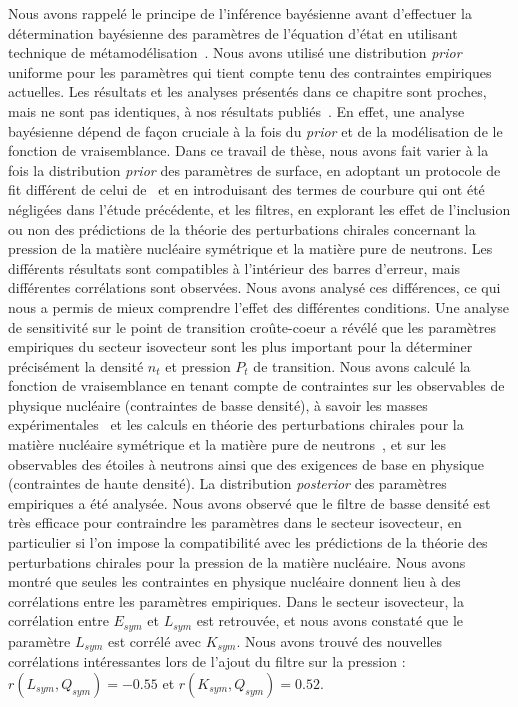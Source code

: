 Nous avons rappelé le principe de l'inférence bayésienne avant d'effectuer la  
détermination bayésienne des paramètres de l'équation d'état en utilisant 
technique de métamodélisation~\cite{Margueron2018a}. Nous avons utilisé une 
distribution \textit{prior} uniforme pour les paramètres qui tient compte tenu 
des contraintes empiriques actuelles. 
%
Les résultats et les analyses présentés dans ce chapitre sont proches, mais ne 
sont pas identiques, à nos résultats 
publiés~\cite{Carreau2019cc,Carreau2019moi}. 
En effet, une analyse bayésienne dépend de façon cruciale à la fois du
\textit{prior} et de la modélisation de le fonction de vraisemblance. 
Dans ce travail de thèse, nous avons fait varier à la fois la distribution
\textit{prior} des paramètres de surface, en adoptant un protocole de fit 
différent de celui de~\cite{Carreau2019cc,Carreau2019moi} et en introduisant 
des termes de courbure qui ont été négligées dans l'étude précédente, et les 
filtres, en explorant les effet de l'inclusion ou non des prédictions de la 
théorie des perturbations chirales concernant la pression de la matière 
nucléaire symétrique et la matière pure de neutrons.
Les différents résultats sont compatibles à l'intérieur des barres d'erreur, 
mais différentes corrélations sont observées. Nous avons analysé ces
différences, ce qui nous a permis de mieux comprendre l'effet des différentes 
conditions.
%
Une analyse de sensitivité sur le point de transition croûte-coeur a révélé que 
les paramètres empiriques du secteur isovecteur sont les plus important pour 
la déterminer précisément la densité $n_t$ et pression $P_t$ de transition. 
Nous avons calculé la fonction de vraisemblance en tenant compte de 
contraintes sur les observables de physique nucléaire (contraintes de basse
densité), à savoir les masses expérimentales~\cite{Huang2017} 
et les calculs en théorie des perturbations chirales pour la matière nucléaire
symétrique et la matière pure de neutrons~\cite{Drischler2016}, et sur les 
observables des étoiles à neutrons ainsi que des exigences de base en physique
(contraintes de haute densité). 
La distribution \textit{posterior} des paramètres empiriques a été analysée. 
Nous avons observé que le filtre de basse densité est très efficace pour 
contraindre les paramètres dans le secteur isovecteur, en particulier si l'on 
impose la compatibilité avec les prédictions de la théorie des perturbations
chirales pour la pression de la matière nucléaire. 
Nous avons montré que seules les contraintes en physique nucléaire donnent lieu 
à des corrélations entre les paramètres empiriques. 
Dans le secteur isovecteur, la corrélation entre $E_{sym}$ et $L_{sym}$ est 
retrouvée, et nous avons constaté que le paramètre $L_{sym}$ est corrélé avec 
$K_{sym}$. Nous avons trouvé des nouvelles corrélations intéressantes lors de 
l'ajout du filtre sur la pression : $r(L_{sym},Q_{sym})=-0.55$ et 
$r(K_{sym},Q_{sym})=0.52$.


